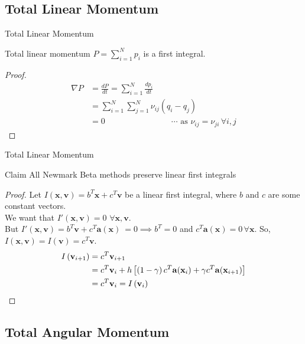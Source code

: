\documentclass{beamer}
\renewcommand{\vec}[1]{\mathbf{#1}}
\begin{document}
\subsection{Total Linear Momentum}

\begin{frame}{Total Linear Momentum}
\begin{theorem} Total linear momentum $P = \sum_{i=1}^{N} p_{i}$ is a first integral. \end{theorem}
\begin{proof}
	\begin{align*}
		\nabla P & = \frac{dP}{dt} = \sum_{i=1}^{N} \frac{dp_{i}}{dt} \\
		&=\sum_{i=1}^{N}\sum_{j=1}^{N}\nu_{ij}\left(q_{i} - q_{j}\right) \\
		& = 0 \qquad \qquad \qquad \qquad \cdots \mbox{ as }\nu_{ij} = \nu_{ji} \, \forall i, j
	\end{align*}
\end{proof}
\end{frame}

\begin{frame}{Total Linear Momentum}
\begin{block}{Claim} All Newmark Beta methods preserve linear first integrals \end{block}
\begin{proof}
	Let $I(\vec{x}, \vec{v}) = b^{T}\vec{x} + c^{T}\vec{v}$ be a linear first integral, where $b$ and $c$ are some constant vectors.\\
	We want that $I'(\vec{x}, \vec{v})= 0$  $\forall \vec{x}, \vec{v}$. \\
	But $I'(\vec{x}, \vec{v}) = b^{T}\vec{v} + c^{T}\vec{a(\vec{x})}\ = 0 \implies b^{T} = 0$ and $c^{T}\vec{a}(\vec{x}) = 0 \, \forall \vec{x}$. So, $I(\vec{x}, \vec{v}) = I(\vec{v}) = c^{T}\vec{v}$.
	\begin{align*}
		I\left(\vec{v}_{i+1}\right) &= c^{T}\vec{v}_{i+1} \\
		&= c^{T}\vec{v}_{i} + h\left[\left(1-\gamma\right)c^{T}\vec{a}(\vec{x}_{i}) + \gamma c^{T}\vec{a}(\vec{x}_{i+1})\right] \\
		&= c^{T}\vec{v}_{i} = I\left(\vec{v}_{i}\right) \qedhere
	\end{align*} 
\end{proof}
\end{frame}

\subsection{Total Angular Momentum}
\end{document}
